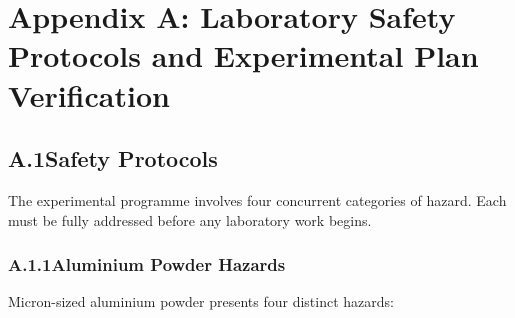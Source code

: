 \documentclass[12pt]{article}
\begin{document}
\break

 


\break

\appendix
\section*{Appendix A: Laboratory Safety Protocols and Experimental Plan Verification}

\subsection*{A.1\quad Safety Protocols}

The experimental programme involves four concurrent categories of hazard. Each must
be fully addressed before any laboratory work begins.

\subsubsection*{A.1.1\quad Aluminium Powder Hazards}

Micron-sized aluminium powder presents four distinct hazards:
\end{document}

